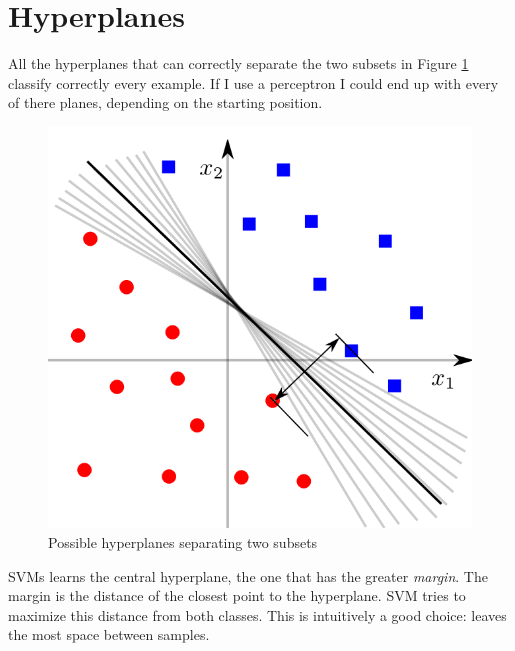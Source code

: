 \section{Hyperplanes}
    All the hyperplanes that can correctly separate the two subsets in Figure \ref{fig:hyperplanesSVMs} classify correctly every example. If I use a perceptron I could end up with every of there planes, depending on the starting position. 
    \begin{figure}[ht]
        \centering
        \includegraphics[scale=0.3]{images/hyperplanes_SVMs.png}
        \caption{Possible hyperplanes separating two subsets}
        \label{fig:hyperplanesSVMs}
    \end{figure}
    SVMs learns the central hyperplane, the one that has the greater \textit{margin}. The margin is the distance  of the closest point to the hyperplane. SVM tries to maximize this distance from both classes.
    This is intuitively a good choice: leaves the most space between samples.
    

